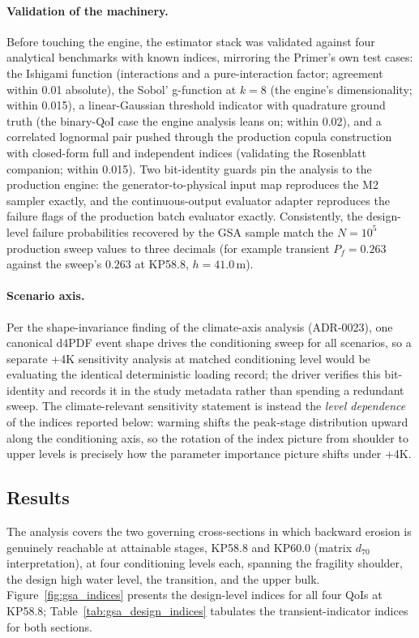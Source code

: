 \paragraph{Validation of the machinery.}
Before touching the engine, the estimator stack was validated against four
analytical benchmarks with known indices, mirroring the Primer's own test
cases: the Ishigami function (interactions and a pure-interaction factor;
agreement within 0.01 absolute), the Sobol' g-function at $k = 8$ (the
engine's dimensionality; within 0.015), a linear-Gaussian threshold
indicator with quadrature ground truth (the binary-QoI case the engine
analysis leans on; within 0.02), and a correlated lognormal pair pushed
through the production copula construction with closed-form full and
independent indices (validating the Rosenblatt companion; within 0.015).
Two bit-identity guards pin the analysis to the production engine: the
generator-to-physical input map reproduces the M2 sampler exactly, and the
continuous-output evaluator adapter reproduces the failure flags of the
production batch evaluator exactly. Consistently, the design-level failure
probabilities recovered by the GSA sample match the $N = 10^5$ production
sweep values to three decimals (for example transient $P_f = 0.263$ against
the sweep's $0.263$ at KP58.8, $h = 41.0$\,m).

\paragraph{Scenario axis.}
Per the shape-invariance finding of the climate-axis analysis (ADR-0023),
one canonical d4PDF event shape drives the conditioning sweep for all
scenarios, so a separate +4K sensitivity analysis at matched conditioning
level would be evaluating the identical deterministic loading record; the
driver verifies this bit-identity and records it in the study metadata
rather than spending a redundant sweep. The climate-relevant sensitivity
statement is instead the \emph{level dependence} of the indices reported
below: warming shifts the peak-stage distribution upward along the
conditioning axis, so the rotation of the index picture from shoulder to
upper levels is precisely how the parameter importance picture shifts under
+4K.

\subsection{Results}
\label{subsec: GSA Results}

The analysis covers the two governing cross-sections in which backward
erosion is genuinely reachable at attainable stages, KP58.8 and KP60.0
(matrix $d_{70}$ interpretation), at four conditioning levels each,
spanning the fragility shoulder, the design high water level, the
transition, and the upper bulk. Figure~\ref{fig:gsa_indices} presents the
design-level indices for all four QoIs at KP58.8;
Table~\ref{tab:gsa_design_indices} tabulates the transient-indicator
indices for both sections.

